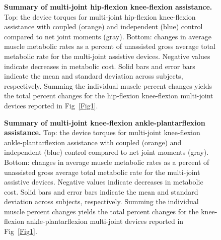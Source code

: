 \documentclass[10pt,letterpaper]{article}
\begin{document}
\begin{figure}[!h]
\begin{adjustwidth}{-1in}{0in} %
    \centering
    \caption{{\bf Summary of multi-joint hip-flexion knee-flexion assistance.}
        Top: the device torques for multi-joint hip-flexion knee-flexion assistance with coupled (orange) and independent (blue) control compared to net joint moments (gray). Bottom: changes in average muscle metabolic rates as a percent of unassisted gross average total metabolic rate for the multi-joint assistive devices. Negative values indicate decreases in metabolic cost. Solid bars and error bars indicate the mean and standard deviation across subjects, respectively. Summing the individual muscle percent changes yields the total percent changes for the hip-flexion knee-flexion multi-joint devices reported in Fig~\ref{Fig1}.}
\label{Fig3}
\end{adjustwidth}
\end{figure}

\begin{figure}[!h]
\begin{adjustwidth}{-1in}{0in} %
    \centering
    \caption{{\bf Summary of multi-joint knee-flexion ankle-plantarflexion assistance.}
        Top: the device torques for multi-joint knee-flexion ankle-plantarflexion assistance with coupled (orange) and independent (blue) control compared to net joint moments (gray). Bottom: changes in average muscle metabolic rates as a percent of unassisted gross average total metabolic rate for the multi-joint assistive devices. Negative values indicate decreases in metabolic cost. Solid bars and error bars indicate the mean and standard deviation across subjects, respectively. Summing the individual muscle percent changes yields the total percent changes for the knee-flexion ankle-plantarflexion multi-joint devices reported in Fig~\ref{Fig1}.}
\label{Fig4}
\end{adjustwidth}
\end{figure}
\end{document}
